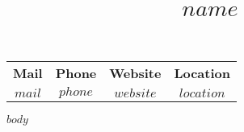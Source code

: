 \documentclass[12pt, courier]{article}
\title{\Huge \flushleft \vspace{-2cm} \textbf{$name$} \vspace{-2cm}}
\date{}
\begin{document}
\maketitle

\begin{table}[H]
\centering
\begin{tabular}{cccc}
\textbf{Mail} & \textbf{Phone} & \textbf{Website} & \textbf{Location} \\
$mail$ & $phone$ & $website$ & $location$                  
\end{tabular}
\end{table}

$body$
\end{document}
